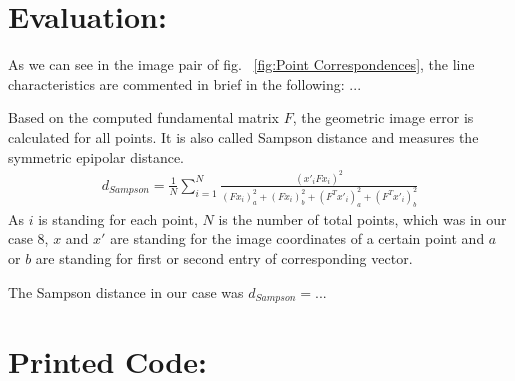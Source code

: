 \documentclass[a4paper,headings=small]{scrartcl}
\numberwithin{equation}{section} %
\numberwithin{figure}{section}   %
\begin{document}
\section{Evaluation:}
As we can see in the image pair of fig. ~\ref{fig:Point Correspondences},
the line characteristics are commented in brief in the following:
...

Based on the computed fundamental matrix $F$, the geometric image error
is calculated for all points. It is also called Sampson distance
and measures the symmetric epipolar distance.
\begin{align}
  d_{Sampson} = \frac{1}{N} \sum_{i=1}^N \frac{(x'_i F x_i)^2}{(F x_i)_a^2 + (F x_i)_b^2 + (F^T x'_i)_a^2 + (F^T x'_i)_b^2}
\end{align}
As $i$ is standing for each point, $N$ is the number of total points, 
which was in our case 8, $x$ and $x'$ are standing for the image coordinates of a certain
point and $a$ or $b$ are standing for first or second entry of corresponding vector.

The Sampson distance in our case was $d_{Sampson}=...$
\section{Printed Code:}


\end{document}
